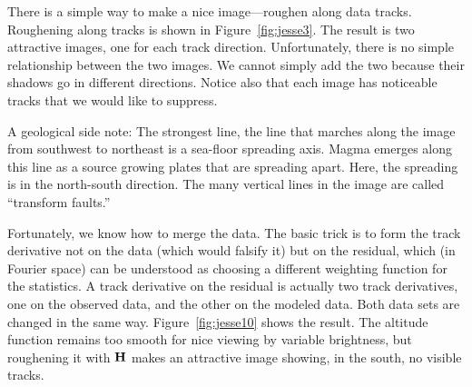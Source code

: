 \par
There is a simple way to make a nice image---roughen along data tracks.
Roughening along tracks is shown in
Figure~\ref{fig:jesse3}.
The result is two attractive images, one for each track direction.
Unfortunately, there is no simple relationship between the two images.
We cannot simply add the two because their shadows go in different directions.
Notice also that each image has noticeable tracks that we would
like to suppress.
\par
A geological side note:
The strongest line, the line that marches along the image from
southwest to northeast is a sea-floor spreading axis.
Magma emerges along this line
as a source growing plates that are spreading apart.
Here,
the spreading is in the north-south direction.
The many vertical lines in the image are called ``transform faults.''
\par
Fortunately, we know how to merge the data.
The basic trick is to form the track derivative
not on the data (which would falsify it)
but on the residual,
which (in Fourier space) can be understood as
choosing a different weighting function for the statistics.
A track derivative on the residual is actually two track derivatives,
one on the observed data, and the other on the modeled data.
Both data sets are changed in the same way.
Figure~\ref{fig:jesse10} shows the result.
The altitude function remains too smooth for nice viewing
by variable brightness,
but roughening it with $\bold H$ makes an attractive image
showing, in the south, no visible tracks.


